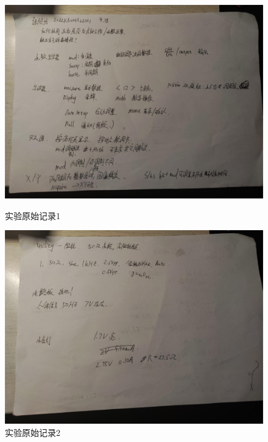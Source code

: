 \documentclass[11pt]{article}
\begin{document}
\begin{figure}[H]
    
    \begin{minipage}[t]{1\linewidth}
        \centering
        \includegraphics[width=15cm]{Fig/8.jpg}
        \caption{实验原始记录1}
        \vspace*{1em}
    \end{minipage}
    
    \begin{minipage}[t]{1\linewidth}
        \centering
        \includegraphics[width=15cm]{Fig/9.jpg}
        \caption{实验原始记录2}
        \vspace*{1em}
    \end{minipage}
\end{figure}
\end{document}
